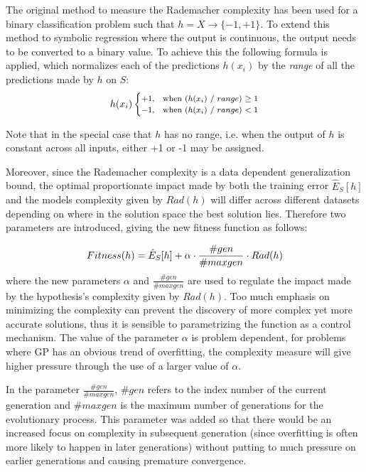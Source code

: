 \documentclass[conference]{IEEEtran}
\begin{document}
\bigbreak
The original method to measure the Rademacher complexity has been used for a binary classification problem such that $h = X \rightarrow \{-1, +1\}$. To extend this method to symbolic regression where the output is continuous, the output needs to be converted to a binary value. To achieve this the following formula is applied, which normalizes each of the predictions $h(x_{i})$ by the \textit{range} of all the predictions made by $h$ on $S$:
\begin{equation}\label{regression}
\footnotesize
h(x_{i})\begin{cases}
    +1, & \text{when $(h(x_{i})$ / $range$) $\geq 1$}\\
    -1, & \text{when $(h(x_{i})$ / $range$) $< 1$}
\end{cases}
\end{equation}

Note that in the special case that $h$ has no range, i.e. when the output of $h$ is constant across all inputs, either +1 or -1 may be assigned.

Moreover, since the Rademacher complexity is a data dependent generalization bound, the optimal proportionate impact made by both the training error $\hat{E}_{S}[h]$ and the models complexity given by $Rad(h)$ will differ across different datasets depending on where in the solution space the best solution lies. Therefore two parameters are introduced, giving the new fitness function as follows:

\begin{equation}\label{fitness_final}
\footnotesize
Fitness(h) = \hat{E}_{S}[h] + \alpha\cdot\frac{\#gen}{\#maxgen} \cdot Rad(h)
\end{equation}
where the new parameters $\alpha$ and $\frac{\#gen}{\#max gen}$ are used to regulate the impact made by the hypothesis's complexity given by $Rad(h)$. Too much emphasis on minimizing the complexity can prevent the discovery of more complex yet more accurate solutions, thus it is sensible to parametrizing the function as a control mechanism. The value of the parameter $\alpha$ is problem dependent, for problems where GP has an obvious trend of overfitting, the complexity measure will give higher pressure through the use of a larger value of $\alpha$.

In the parameter $\frac{\#gen}{\#maxgen}$, $\#gen$ refers to the index number of the current generation and $\#maxgen$ is the maximum number of generations for the evolutionary process. This parameter was added so that there would be an increased focus on complexity in subsequent generation (since overfitting is often more likely to happen in later generations) without putting to much pressure on earlier generations and causing premature convergence.
\end{document}
